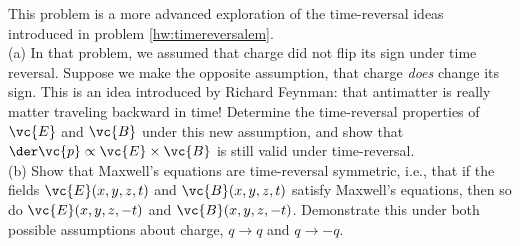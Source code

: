 This problem is a more advanced exploration of the time-reversal ideas introduced
        in problem \ref{hw:timereversalem}.\\
        (a) In that problem, we assumed that charge did not flip
        its sign under time reversal. Suppose we make the opposite assumption, that
        charge \emph{does} change its sign. This is an idea introduced by Richard Feynman:
        that antimatter is really matter traveling backward in time! Determine the
        time-reversal properties of $\vc{E}$ and $\vc{B}$ under this new assumption,
        and show that $\der\vc{p}\propto\vc{E}\times\vc{B}$ is still valid under time-reversal.\\
        (b) Show that Maxwell's equations are time-reversal symmetric, i.e., that
        if the fields $\vc{E}(x,y,z,t)$ and $\vc{B}(x,y,z,t)$ satisfy
        Maxwell's equations, then so do  $\vc{E}(x,y,z,-t)$ and $\vc{B}(x,y,z,-t)$.
        Demonstrate this under both possible assumptions about charge, $q\rightarrow q$ and
        $q\rightarrow -q$.

